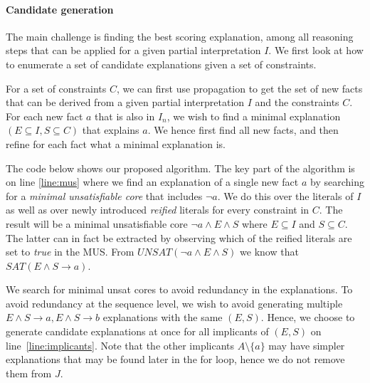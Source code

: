 \paragraph{Candidate generation}
The main challenge is finding the best scoring explanation, among all reasoning steps that can be applied for a given partial interpretation $I$. We first look at how to enumerate a set of candidate explanations given a set of constraints.

For a set of constraints $C$, we can first use propagation to get the set of new facts that can be derived from a given partial interpretation $I$ and the constraints $C$. For each new fact $a$ that is also in $I_n$, we wish to find a minimal explanation $(E \subseteq I, S \subseteq C)$ that explains $a$. We hence first find all new facts, and then refine for each fact what a minimal explanation is.

The code below shows our proposed algorithm. The key part of the algorithm is on line \ref{line:mus} where we find an explanation of a single new fact $a$ by searching for a \textit{minimal unsatisfiable core} that includes $\neg a$. We do this over the literals of $I$ as well as over newly introduced \textit{reified} literals for every constraint in $C$. The result will be a minimal unsatisfiable core $\neg a \wedge E \wedge S$ where $E \subseteq I$ and $S \subseteq C$. The latter can in fact be extracted by observing which of the reified literals are set to \textit{true} in the MUS. From $UNSAT(\neg a \wedge E \wedge S)$ we know that $SAT(E \wedge S \rightarrow a)$.

We search for minimal unsat cores to avoid redundancy in the explanations. To avoid redundancy at the sequence level, we wish to avoid generating multiple $E \wedge S \rightarrow a, E \wedge S \rightarrow b$ explanations with the same $(E, S)$. Hence, we choose to generate candidate explanations at once for all implicants of $(E, S)$ on line~\ref{line:implicants}. Note that the other implicants $A \setminus \{a\}$ may have simpler explanations that may be found later in the for loop, hence we do not remove them from $J$.

